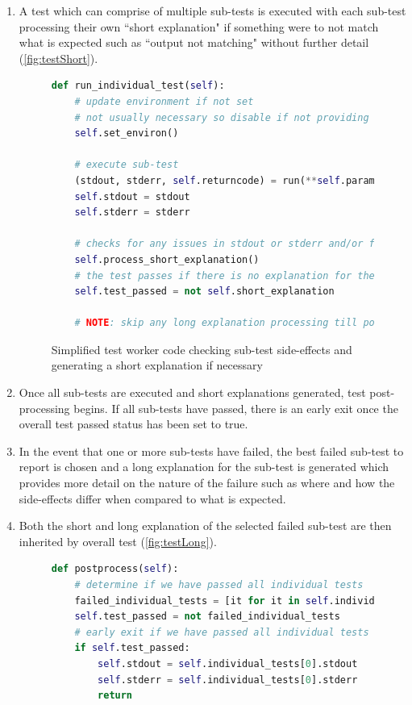 \documentclass[hidelinks]{report}
\begin{document}
\begin{enumerate}
	\item A test which can comprise of multiple sub-tests is executed with each sub-test processing their own ``short explanation" if something were to not match what is expected such as ``output not matching" without further detail (\autoref{fig:testShort}).
	\begin{figure}[h]
		\centering
		\begin{lstlisting}[language=python, breaklines=true, linewidth=\linewidth, tabsize=4]
def run_individual_test(self):
    # update environment if not set
    # not usually necessary so disable if not providing any benefit
    self.set_environ()

	# execute sub-test
    (stdout, stderr, self.returncode) = run(**self.parameters)   
    self.stdout = stdout
    self.stderr = stderr

    # checks for any issues in stdout or stderr and/or files
    self.process_short_explanation()
    # the test passes if there is no explanation for the error
    self.test_passed = not self.short_explanation

    # NOTE: skip any long explanation processing till postprocessing and only do it if necessary
		\end{lstlisting}
		\caption{Simplified test worker code checking sub-test side-effects and generating a short explanation if necessary}
		\label{fig:testShort}
	\end{figure}
	\item Once all sub-tests are executed and short explanations generated, test post-processing begins. If all sub-tests have passed, there is an early exit once the overall test passed status has been set to true.
	\item In the event that one or more sub-tests have failed, the best failed sub-test to report is chosen and a long explanation for the sub-test is generated which provides more detail on the nature of the failure such as where and how the side-effects differ when compared to what is expected.
	\item Both the short and long explanation of the selected failed sub-test are then inherited by overall test (\autoref{fig:testLong}).
	\begin{figure}[h]
		\centering
		\begin{lstlisting}[language=python, breaklines=true, linewidth=\linewidth, tabsize=4]
def postprocess(self):
    # determine if we have passed all individual tests
    failed_individual_tests = [it for it in self.individual_tests if not it.passed()]
    self.test_passed = not failed_individual_tests
    # early exit if we have passed all individual tests
    if self.test_passed:
        self.stdout = self.individual_tests[0].stdout
        self.stderr = self.individual_tests[0].stderr
        return


\end{lstlisting}
\end{figure}
\end{enumerate}
\end{document}
